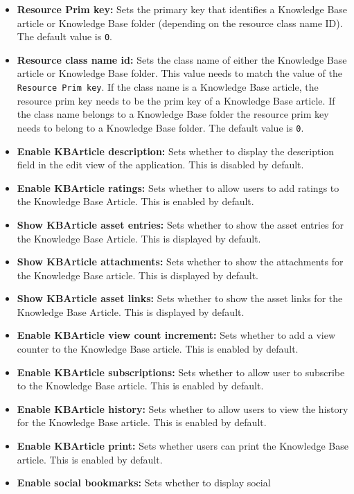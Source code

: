 \begin{itemize}
\item
  \textbf{Resource Prim key:} Sets the primary key that identifies a
  Knowledge Base article or Knowledge Base folder (depending on the
  resource class name ID). The default value is \texttt{0}.
\item
  \textbf{Resource class name id:} Sets the class name of either the
  Knowledge Base article or Knowledge Base folder. This value needs to
  match the value of the \texttt{Resource\ Prim\ key}. If the class name
  is a Knowledge Base article, the resource prim key needs to be the
  prim key of a Knowledge Base article. If the class name belongs to a
  Knowledge Base folder the resource prim key needs to belong to a
  Knowledge Base folder. The default value is \texttt{0}.
\item
  \textbf{Enable KBArticle description:} Sets whether to display the
  description field in the edit view of the application. This is
  disabled by default.
\item
  \textbf{Enable KBArticle ratings:} Sets whether to allow users to add
  ratings to the Knowledge Base Article. This is enabled by default.
\item
  \textbf{Show KBArticle asset entries:} Sets whether to show the asset
  entries for the Knowledge Base Article. This is displayed by default.
\item
  \textbf{Show KBArticle attachments:} Sets whether to show the
  attachments for the Knowledge Base article. This is displayed by
  default.
\item
  \textbf{Show KBArticle asset links:} Sets whether to show the asset
  links for the Knowledge Base Article. This is displayed by default.
\item
  \textbf{Enable KBArticle view count increment:} Sets whether to add a
  view counter to the Knowledge Base article. This is enabled by
  default.
\item
  \textbf{Enable KBArticle subscriptions:} Sets whether to allow user to
  subscribe to the Knowledge Base article. This is enabled by default.
\item
  \textbf{Enable KBArticle history:} Sets whether to allow users to view
  the history for the Knowledge Base article. This is enabled by
  default.
\item
  \textbf{Enable KBArticle print:} Sets whether users can print the
  Knowledge Base article. This is enabled by default.
\item
  \textbf{Enable social bookmarks:} Sets whether to display social

\end{itemize}
